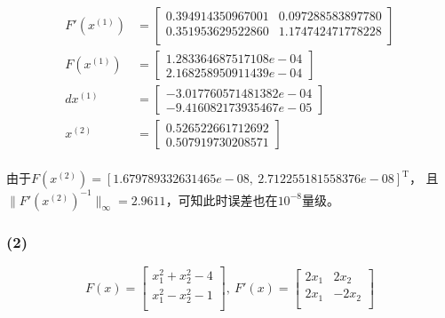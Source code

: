 \documentclass[UTF8,zihao=5]{ctexart}
\newcommand{\trans}[0]{^\mathrm{T}}
\begin{document}
$$
    \begin{aligned}
        F'(x^{(1)}) & =\begin{bmatrix}
            0.394914350967001 & 0.097288583897780 \\
            0.351953629522860 & 1.174742471778228 \\
        \end{bmatrix} \\
        F(x^{(1)})  & =\begin{bmatrix}
            1.283364687517108e-04 \\2.168258950911439e-04
        \end{bmatrix} \\
        dx^{(1)}    & =\begin{bmatrix}
            -3.017760571481382e-04 \\-9.416082173935467e-05
        \end{bmatrix} \\
        x^{(2)}     & =\begin{bmatrix}
            0.526522661712692 \\0.507919730208571
        \end{bmatrix} \\
    \end{aligned}
$$

由于$F(x^{(2)})=[1.679789332631465e-08,\ 2.712255181558376e-08]\trans $，
且$\|F'(x^{(2)})^{-1}\|_\infty=2.9611$，可知此时误差也在$10^{-8}$量级。

\subsubsection*{(2)}

$$
    F(x)=\begin{bmatrix}
        x_1^2+x_2^2-4 \\
        x_1^2-x_2^2-1 \\
    \end{bmatrix},\
    F'(x)=\begin{bmatrix}
        2x_1 & 2x_2  \\
        2x_1 & -2x_2 \\
    \end{bmatrix}
$$  
\end{document}
